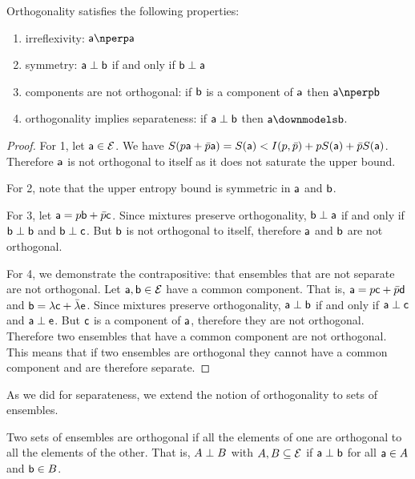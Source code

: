 \begin{mathSection}
\begin{prop}
	Orthogonality satisfies the following properties:
	\begin{enumerate}
		\item irreflexivity: $\ens[a] \northo \ens[a]$
		\item symmetry: $\ens[a] \ortho \ens[b]$ if and only if $\ens[b] \ortho \ens[a]$
		\item components are not orthogonal: if $\ens[b]$ is a component of $\ens[a]$ then $\ens[a] \northo \ens[b]$
		\item orthogonality implies separateness: if $\ens[a] \ortho \ens[b]$ then $\ens[a] \separate \ens[b]$.
	\end{enumerate}
\end{prop}

\begin{proof}
	For 1, let $\ens[a] \in \Ens$. We have $S(p\ens[a] + \bar{p}\ens[a]) = S(\ens[a]) < I(p,\bar{p}) + p S(\ens[a]) + \bar{p} S(\ens[a])$. Therefore $\ens[a]$ is not orthogonal to itself as it does not saturate the upper bound.
	
	For 2, note that the upper entropy bound is symmetric in $\ens[a]$ and $\ens[b]$.
	
	For 3, let $\ens[a] = p \ens[b] + \bar{p} \ens[c]$. Since mixtures preserve orthogonality, $\ens[b] \ortho \ens[a]$ if and only if $\ens[b] \ortho \ens[b]$ and $\ens[b] \ortho \ens[c]$. But $\ens[b]$ is not orthogonal to itself, therefore $\ens[a]$ and $\ens[b]$ are not orthogonal.
	
	For 4, we demonstrate the contrapositive: that ensembles that are not separate are not orthogonal. Let $\ens[a], \ens[b] \in \Ens$ have a common component. That is, $\ens[a] = p \ens[c] + \bar{p} \ens[d]$ and $\ens[b] = \lambda \ens[c] + \bar{\lambda} \ens[e]$. Since mixtures preserve orthogonality, $\ens[a] \ortho \ens[b]$ if and only if $\ens[a] \ortho \ens[c]$ and $\ens[a] \ortho \ens[e]$. But $\ens[c]$ is a component of $\ens[a]$, therefore they are not orthogonal. Therefore two ensembles that have a common component are not orthogonal. This means that if two ensembles are orthogonal they cannot have a common component and are therefore separate.
\end{proof}

As we did for separateness, we extend the notion of orthogonality to sets of ensembles.

\begin{defn}
	Two sets of ensembles are orthogonal if all the elements of one are orthogonal to all the elements of the other. That is, $A \ortho B$ with $A, B \subseteq \Ens$ if $\ens[a] \ortho \ens[b]$ for all $\ens[a] \in A$ and $\ens[b] \in B$. 
\end{defn}


\end{mathSection}
